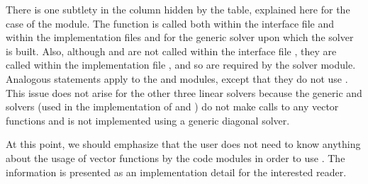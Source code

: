 There is one subtlety in the {\cvspils} column hidden by the table, explained
here for the case of the {\cvspgmr} module. 
The  function is called both within the interface file
 and within the implementation
files  and  for the generic
{\spgmr} solver upon which the {\cvspgmr} solver is built.  Also, although
 and  are not called within the interface file
, they are called within the implementation file
, and so are required by the {\cvspgmr} solver module.
Analogous statements apply to the {\cvspbcg} and {\cvsptfqmr} modules,
except that they do not use .
This issue does not arise for the other 
three {\cvode} linear solvers because the generic {\dense} and {\band} solvers 
(used in the implementation of {\cvdense} and {\cvband}) do not make calls to 
any vector functions and {\cvdiag} is not implemented using a generic diagonal solver. 

At this point, we should emphasize that the {\cvode} user does not need to know 
anything about the usage of vector functions by the {\cvode} code modules in order 
to use {\cvode}. The information is presented as an implementation detail for the 
interested reader.


